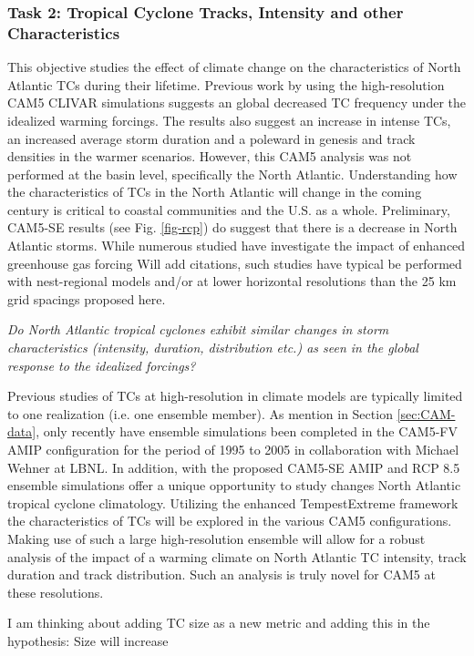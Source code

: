 \documentclass[11pt]{article}
\begin{document}
\subsubsection{Task 2: Tropical Cyclone Tracks, Intensity and other Characteristics}

This objective studies the effect of climate change on the characteristics of North Atlantic TCs during their lifetime. Previous work by \citet{Wehner2015} using the high-resolution CAM5 CLIVAR simulations suggests an global decreased TC frequency under the idealized warming forcings. The results also suggest an increase in intense TCs, an increased average storm duration and a poleward in genesis and track densities in the warmer scenarios. However, this CAM5 analysis was not performed at the basin level, specifically the North Atlantic. Understanding how the characteristics of TCs in the North Atlantic will change in the coming century is critical to coastal communities and the U.S. as a whole. Preliminary, CAM5-SE results (see Fig. \ref{fig-rcp}) do suggest that there is a decrease in North Atlantic storms. While numerous studied have investigate the impact of enhanced greenhouse gas forcing {\color{red}Will add citations}, such studies have typical be performed with nest-regional models and/or at lower horizontal resolutions than the 25 km grid spacings proposed here.  

\emph{Do North Atlantic tropical cyclones exhibit similar changes in storm characteristics (intensity, duration, distribution etc.) as seen in the global response to the idealized forcings?}

Previous studies of TCs at high-resolution in climate models are typically limited to one realization (i.e. one ensemble member). As mention in Section \ref{sec:CAM-data}, only recently have ensemble simulations been completed in the CAM5-FV AMIP configuration for the period of 1995 to 2005 in collaboration with Michael Wehner at LBNL. In addition, with the proposed CAM5-SE AMIP and RCP 8.5 ensemble simulations offer a unique opportunity to study changes North Atlantic tropical cyclone climatology. Utilizing the enhanced TempestExtreme framework the characteristics of TCs will be explored in the various CAM5 configurations. Making use of such a large high-resolution ensemble will allow for a robust analysis of the impact of a warming climate on North Atlantic TC intensity, track duration and track distribution. Such an analysis is truly novel for CAM5 at these resolutions.

{\color{red} I am thinking about adding TC size as a new metric and adding this in the hypothesis: Size will increase}
\end{document}
